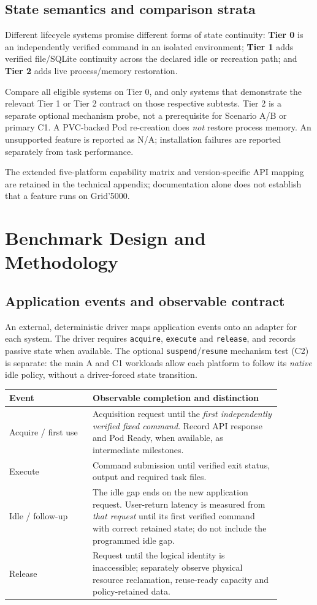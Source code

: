 \documentclass[
  a4paper,
]{article}
\begin{document}
\subsection{State semantics and comparison strata}
Different lifecycle systems promise
different forms of state continuity:
\textbf{Tier 0} is an independently verified
command in an isolated environment;
\textbf{Tier 1} adds verified file/SQLite
continuity across the declared idle or
recreation path; and \textbf{Tier 2}
adds live process/memory restoration.

Compare all eligible systems on Tier 0,
and only systems that demonstrate the
relevant Tier 1 or Tier 2 contract on
those respective subtests.
Tier 2 is a separate optional
mechanism probe, not a prerequisite
for Scenario A/B or primary C1.
A PVC-backed Pod re-creation does
\emph{not} restore process memory.
An unsupported feature is reported
as N/A; installation failures
are reported separately from
task performance.

The extended five-platform capability
matrix and version-specific API
mapping are retained in the
technical appendix; documentation
alone does not establish that
a feature runs on Grid'5000.

\section{Benchmark Design and Methodology}
\label{sec:methodology}
\subsection{Application events and observable contract}
An external, deterministic driver maps application
events onto an adapter for each system.
The driver requires \texttt{acquire},
\texttt{execute} and \texttt{release},
and records passive state when available.
The optional \texttt{suspend}/\texttt{resume}
mechanism test (C2) is separate: the main
A and C1 workloads allow each platform
to follow its \emph{native} idle policy,
without a driver-forced state transition.

{\small
\begin{longtable}{@{}p{0.27\linewidth}p{0.61\linewidth}@{}}
\toprule
Event & Observable completion and distinction\\
\midrule
\endhead
\bottomrule
\endlastfoot
Acquire / first use &
Acquisition request until the \emph{first
independently verified fixed command}.
Record API response and Pod Ready,
when available, as intermediate milestones.\\
Execute &
Command submission until verified
exit status, output and required task files.\\
Idle / follow-up &
The idle gap ends on the new application
request. User-return latency is measured
from \emph{that request} until its first
verified command with correct retained state;
do not include the programmed idle gap.\\
Release &
Request until the logical identity is
inaccessible; separately observe physical
resource reclamation, reuse-ready capacity
and policy-retained data.\\
\end{longtable}
}
\end{document}
